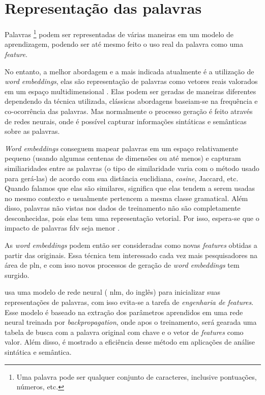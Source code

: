 \section{Representação das palavras}\label{sec:representacaodaspalavras}

Palavras \footnote{Uma palavra pode ser qualquer conjunto de caracteres, inclusive pontuações, números, etc.} podem ser representadas de várias maneiras em um modelo de aprendizagem, podendo ser até mesmo feito o uso real da palavra como uma \textit{feature}.

No entanto, a melhor abordagem e a mais indicada atualmente é a utilização de \textit{word embeddings}, elas são representação de palavras como vetores reais valorados em um espaço multidimensional \cite{turian2010word}. Elas podem ser geradas de maneiras diferentes dependendo da técnica utilizada, clássicas abordagens baseiam-se na frequência e co-ocorrência das palavras. Mas normalmente o processo geração é feito através de redes neurais, onde é possível capturar informações sintáticas e semânticas sobre as palavras. 

\textit{Word embeddings} conseguem mapear palavras em um espaço relativamente pequeno (usando algumas centenas de dimensões ou até menos) e capturam similiaridades entre as palavras (o tipo de similaridade varia com o método usado para gerá-las) de acordo com sua distância euclidiana, \textit{cosine}, Jaccard, etc. Quando falamos que elas são similares, significa que elas tendem a serem usadas no mesmo contexto e usualmente pertencem a mesma classe gramatical. Além disso, palavras não vistas nos dados de treinamento não são completamente desconhecidas, pois elas tem uma representação vetorial. Por isso, espera-se que o impacto de palavras \ac{fdv} seja menor \cite{fonseca2015evaluating}.

As \textit{word embeddings} podem então ser consideradas como novas \textit{features} obtidas a partir das originais. Essa técnica tem interessado cada vez mais pesquisadores na área de \ac{pln}, e com isso novos processos de geração de \textit{word embeddings} tem surgido.

\cite{collobert2011natural} usa uma modelo de rede neural (
\ac{nlm}, do inglês) para inicializar suas representações de palavras, com isso evita-se a tarefa de \textit{engenharia de features}. Esse modelo é baseado na extração dos parâmetros aprendidos em uma rede neural treinada por \textit{backpropagation}, onde apos o treinamento, será gearada uma tabela de busca com a palavra original com chave e o vetor de \textit{features} como valor. Além disso, é mostrado a eficiência desse método em aplicações de análise sintática e semântica.

